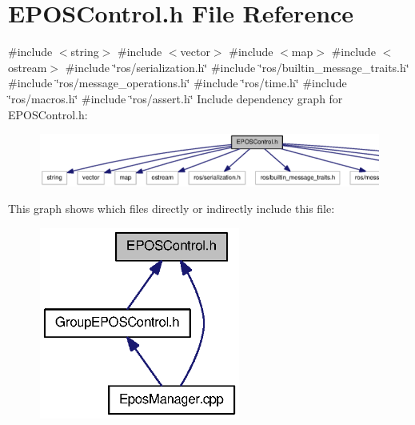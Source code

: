 \section{\-E\-P\-O\-S\-Control.\-h \-File \-Reference}
\label{EPOSControl_8h}
{\ttfamily \#include $<$string$>$}\*
{\ttfamily \#include $<$vector$>$}\*
{\ttfamily \#include $<$map$>$}\*
{\ttfamily \#include $<$ostream$>$}\*
{\ttfamily \#include \char`\"{}ros/serialization.\-h\char`\"{}}\*
{\ttfamily \#include \char`\"{}ros/builtin\-\_\-message\-\_\-traits.\-h\char`\"{}}\*
{\ttfamily \#include \char`\"{}ros/message\-\_\-operations.\-h\char`\"{}}\*
{\ttfamily \#include \char`\"{}ros/time.\-h\char`\"{}}\*
{\ttfamily \#include \char`\"{}ros/macros.\-h\char`\"{}}\*
{\ttfamily \#include \char`\"{}ros/assert.\-h\char`\"{}}\*
\-Include dependency graph for \-E\-P\-O\-S\-Control.\-h\-:
\nopagebreak
\begin{figure}[H]
\begin{center}
\leavevmode
\includegraphics[width=350pt]{EPOSControl_8h__incl}
\end{center}
\end{figure}
\-This graph shows which files directly or indirectly include this file\-:
\nopagebreak
\begin{figure}[H]
\begin{center}
\leavevmode
\includegraphics[width=187pt]{EPOSControl_8h__dep__incl}
\end{center}
\end{figure}
